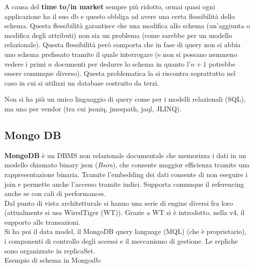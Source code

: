 A causa del \textbf{time to/in market} sempre più ridotto, ormai quasi ogni applicazione ha il suo db e questo obbliga ad avere una certa flessibilità dello schema.
Questa flessibilità garantisce che una modifica allo schema (un’aggiunta o modifica degli attributi) non sia un problema (come sarebbe per un modello relazionale). 
Questa flessibilità però comporta che in fase di query non si abbia uno schema prefissato tramite il quale interrogare (e non si possano nemmeno vedere i primi $n$ documenti per dedurre lo schema in quanto l’$n+1$ potrebbe essere comunque diverso). Questa problematica la si riscontra soprattutto nel caso in cui si utilizzi un database costruito da terzi.

Non si ha più un unico linguaggio di query come per i modelli relazionali (SQL), ma uno per vendor (tra cui jsoniq, jmespath, jaql, JLINQ).

\subsection{Mongo DB}
\textbf{MongoDB} è un DBMS non relazionale documentale che memorizza i dati in un modello chiamato binary json (\textit{Bson}), che consente maggior efficienza tramite una rappresentazione binaria. Tramite l’embedding dei dati consente di non eseguire i join e permette anche l’accesso tramite indici. Supporta comunque il referencing anche se con cali di performances.\\
Dal punto di vista architetturale si hanno una serie di engine diversi fra loro (attualmente si usa WiredTiger (WT)). Grazie a WT si è introdotto, nella v4, il supporto alle transazioni. \\
Si ha poi il data model, il MongoDB query language (MQL) (che è proprietario), i componenti di controllo degli accessi e il meccanismo di gestione. 
Le repliche sono organizzate in replicaSet. \\
Esempio di schema in Mongodb: 

